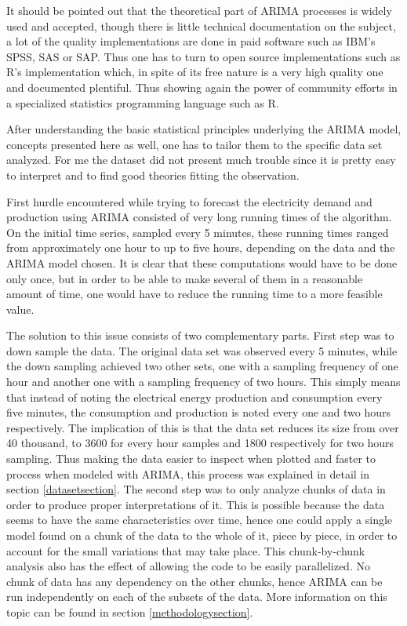 \documentclass[12pt,a4paper,titlepage]{report}
\begin{document}
It should be pointed out that the theoretical part of ARIMA processes is widely used and accepted, though there is little technical documentation on the subject, a lot of the quality implementations are done in paid software such as IBM's SPSS, SAS or SAP. Thus one has to turn to open source implementations such as R's implementation which, in spite of its free nature is a very high quality one and documented plentiful. Thus showing again the power of community efforts in a specialized statistics programming language such as R.

After understanding the basic statistical principles underlying the ARIMA model, concepts presented here as well, one has to tailor them to the specific data set analyzed. For me the dataset did not present much trouble since it is pretty easy to interpret and to find good theories fitting the observation.

First hurdle encountered while trying to forecast the electricity demand and production using ARIMA consisted of very long running times of the algorithm. On the initial time series, sampled every 5 minutes, these running times ranged from approximately one hour to up to five hours, depending on the data and the ARIMA model chosen. It is clear that these computations would have to be done only once, but in order to be able to make several of them in a reasonable amount of time, one would have to reduce the running time to a more feasible value.

The solution to this issue consists of two complementary parts. First step was to down sample the data. The original data set was observed every 5 minutes, while the down sampling achieved two other sets, one with a sampling frequency of one hour and another one with a sampling frequency of two hours. This simply means that instead of noting the electrical energy production and consumption every five minutes, the consumption and production is noted every one and two hours respectively. The implication of this is that the data set reduces its size from over 40 thousand, to 3600 for every hour samples and 1800 respectively for two hours sampling. Thus making the data easier to inspect when plotted and faster to process when modeled with ARIMA, this process was explained in detail in section \ref{datasetsection}. The second step was to only analyze chunks of data in order to produce proper interpretations of it. This is possible because the data seems to have the same characteristics over time, hence one could apply a single model found on a chunk of the data to the whole of it, piece by piece, in order to account for the small variations that may take place. This chunk-by-chunk analysis also has the effect of allowing the code to be easily parallelized. No chunk of data has any dependency on the other chunks, hence ARIMA can be run independently on each of the subsets of the data. More information on this topic can be found in section \ref{methodologysection}.
\end{document}
